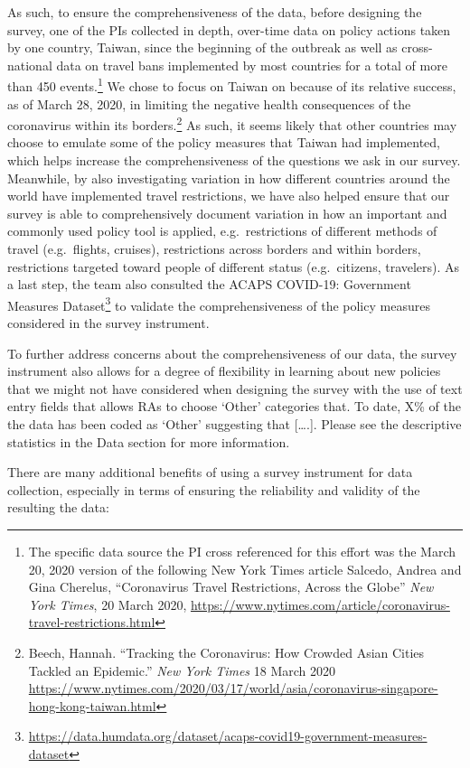 \documentclass[
]{article}
\begin{document}
As such, to ensure the comprehensiveness of the data, before designing the survey, one of the PIs collected in depth, over-time data on policy actions taken by one country, Taiwan, since the beginning of the outbreak as well as cross-national data on travel bans implemented by most countries for a total of more than 450 events.\footnote{The specific data source the PI cross referenced for this effort was the March 20, 2020 version of the following New York Times article Salcedo, Andrea and Gina Cherelus, ``Coronavirus Travel Restrictions, Across the Globe'' \emph{New York Times}, 20 March 2020, \url{https://www.nytimes.com/article/coronavirus-travel-restrictions.html}} We chose to focus on Taiwan on because of its relative success, as of March 28, 2020, in limiting the negative health consequences of the coronavirus within its borders.\footnote{Beech, Hannah. ``Tracking the Coronavirus: How Crowded Asian Cities Tackled an Epidemic.'' \emph{New York Times} 18 March 2020 \url{https://www.nytimes.com/2020/03/17/world/asia/coronavirus-singapore-hong-kong-taiwan.html}} As such, it seems likely that other countries may choose to emulate some of the policy measures that Taiwan had implemented, which helps increase the comprehensiveness of the questions we ask in our survey. Meanwhile, by also investigating variation in how different countries around the world have implemented travel restrictions, we have also helped ensure that our survey is able to comprehensively document variation in how an important and commonly used policy tool is applied, e.g.~restrictions of different methods of travel (e.g.~flights, cruises), restrictions across borders and within borders, restrictions targeted toward people of different status (e.g.~citizens, travelers). As a last step, the team also consulted the ACAPS COVID-19: Government Measures Dataset\footnote{\url{https://data.humdata.org/dataset/acaps-covid19-government-measures-dataset}} to validate the comprehensiveness of the policy measures considered in the survey instrument.

To further address concerns about the comprehensiveness of our data, the survey instrument also allows for a degree of flexibility in learning about new policies that we might not have considered when designing the survey with the use of text entry fields that allows RAs to choose `Other' categories that. To date, X\% of the the data has been coded as `Other' suggesting that {[}\ldots.{]}. Please see the descriptive statistics in the Data section for more information.

There are many additional benefits of using a survey instrument for data collection, especially in terms of ensuring the reliability and validity of the resulting the data:
\end{document}
